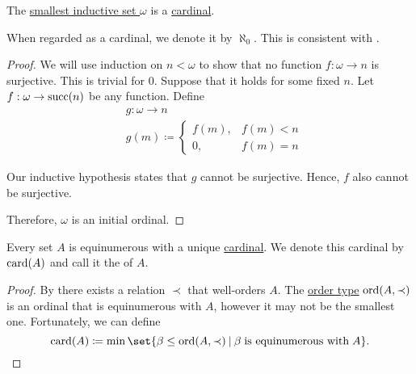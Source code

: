 \begin{proposition}\label{thm:omega_is_a_cardinal}
  The \hyperref[thm:smallest_inductive_set_existence]{smallest inductive set \( \omega \)} is a \hyperref[def:cardinal]{cardinal}.

  When regarded as a cardinal, we denote it by \( \aleph_0 \). This is consistent with .
\end{proposition}
\begin{proof}
  We will use induction on \( n < \omega \) to show that no function \( f: \omega \to n \) is surjective. This is trivial for \( 0 \). Suppose that it holds for some fixed \( n \). Let \( f: \omega \to \operatorname{succ}(n) \) be any function. Define
  \begin{equation*}
    \begin{aligned}
      &g: \omega \to n \\
      &g(m) \coloneqq \begin{cases}
        f(m), &f(m) < n \\
        0,    &f(m) = n
      \end{cases}
    \end{aligned}
  \end{equation*}

  Our inductive hypothesis states that \( g \) cannot be surjective. Hence, \( f \) also cannot be surjective.

  Therefore, \( \omega \) is an initial ordinal.
\end{proof}

\begin{proposition}\label{thm:cardinality_existence}
  Every set \( A \) is equinumerous with a unique \hyperref[def:cardinal]{cardinal}. We denote this cardinal by \( \operatorname{card}(A) \) and call it the  of \( A \).
\end{proposition}
\begin{proof}
  By  there exists a relation \( \prec \) that well-orders \( A \). The \hyperref[thm:well_ordered_order_type_existence]{order type} \( \operatorname{ord}(A, \prec) \) is an ordinal that is equinumerous with \( A \), however it may not be the smallest one. Fortunately, we can define
  \begin{equation*}
    \card(A) \coloneqq \min\set{ \beta \leq \ord(A, \prec) \given \beta \T{is equinumerous with} A }.
  \end{equation*}
\end{proof}

